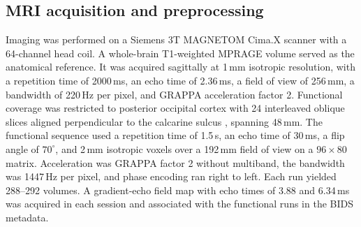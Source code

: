 \subsection{MRI acquisition and preprocessing}
\label{sec:methods:mri}

Imaging was performed on a Siemens 3T MAGNETOM Cima.X scanner with a 64-channel head coil. A whole-brain T1-weighted MPRAGE volume served as the anatomical reference. It was acquired sagittally at 1\,mm isotropic resolution, with a repetition time of 2000\,ms, an echo time of 2.36\,ms, a field of view of 256\,mm, a bandwidth of 220\,Hz per pixel, and GRAPPA acceleration factor 2. Functional coverage was restricted to posterior occipital cortex with 24 interleaved oblique slices aligned perpendicular to the calcarine sulcus \parencite{brouwer2009}, spanning 48\,mm. The functional sequence used a repetition time of 1.5\,s, an echo time of 30\,ms, a flip angle of $70^\circ$, and 2\,mm isotropic voxels over a 192\,mm field of view on a $96 \times 80$ matrix. Acceleration was GRAPPA factor 2 without multiband, the bandwidth was 1447\,Hz per pixel, and phase encoding ran right to left. Each run yielded 288--292 volumes. A gradient-echo field map with echo times of 3.88 and 6.34\,ms was acquired in each session and associated with the functional runs in the BIDS metadata.

